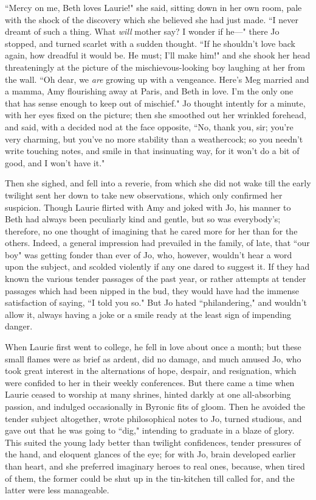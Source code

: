 ``Mercy on me, Beth loves Laurie!" she said, sitting down in her own
room, pale with the shock of the discovery which she believed she had
just made. ``I never dreamt of such a thing. What \emph{will} mother say?
I wonder if he---" there Jo stopped, and turned scarlet with a sudden
thought. ``If he shouldn't love back again, how dreadful
it would be. He must; I'll make him!" and she shook her
head threateningly at the picture of the mischievous-looking boy
laughing at her from the wall. ``Oh dear, we \emph{are} growing up with a
vengeance. Here's Meg married and a mamma, Amy
flourishing away at Paris, and Beth in love. I'm the
only one that has sense enough to keep out of mischief." Jo thought
intently for a minute, with her eyes fixed on the picture; then she
smoothed out her wrinkled forehead, and said, with a decided nod at the
face opposite, ``No, thank you, sir; you're very
charming, but you've no more stability than a
weathercock; so you needn't write touching notes, and
smile in that insinuating way, for it won't do a bit of
good, and I won't have it."

Then she sighed, and fell into a reverie, from which she did not wake
till the early twilight sent her down to take new observations, which
only confirmed her suspicion. Though Laurie flirted with Amy and joked
with Jo, his manner to Beth had always been peculiarly kind and gentle,
but so was everybody's; therefore, no one thought of
imagining that he cared more for her than for the others. Indeed, a
general impression had prevailed in the family, of late, that ``our boy"
was getting fonder than ever of Jo, who, however,
wouldn't hear a word upon the subject, and scolded
violently if any one dared to suggest it. If they had known the various
tender passages of the past year, or rather attempts at tender passages
which had been nipped in the bud, they would have had the immense
satisfaction of saying, ``I told you so." But Jo hated ``philandering,"
and wouldn't allow it, always having a joke or a smile
ready at the least sign of impending danger.

When Laurie first went to college, he fell in love about once a month;
but these small flames were as brief as ardent, did no damage, and much
amused Jo, who took great interest in the alternations of hope, despair,
and resignation, which were confided to her in their weekly conferences.
But there came a time when Laurie ceased to worship at many shrines,
hinted darkly at one all-absorbing passion, and indulged occasionally in
Byronic fits of gloom. Then he avoided the tender subject altogether,
wrote philosophical notes to Jo, turned studious, and gave out that he
was going to ``dig," intending to graduate in a blaze of glory. This
suited the young lady better than twilight confidences, tender pressures
of the hand, and eloquent glances of the eye; for with Jo, brain
developed earlier than heart, and she preferred imaginary heroes to real
ones, because, when tired of them, the former could be shut up in the
tin-kitchen till called for, and the latter were less manageable.

